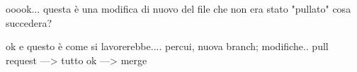 \usepackage{pdfcomment}


    ooook... questa è una modifica di nuovo del file che non era stato "pullato" cosa succedera?

    ok e questo è come si lavorerebbe....
    percui, nuova branch;
    modifiche..
    pull request
    ---> tutto ok ---> merge
